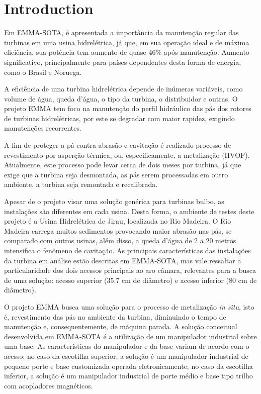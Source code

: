 \section{Introduction}


Em EMMA-SOTA, é apresentada a importância da manutenção regular das turbinas em
uma usina hidrelétrica, já que, em sua operação ideal e de máxima eficiência,
sua potência tem aumento de quase 46\% após manutenção. Aumento significativo,
principalmente para países dependentes desta forma de energia, como o Brasil e
Noruega.

A eficiência de uma turbina hidrelétrica depende de inúmeras variáveis, como
volume de água, queda d'água, o tipo da turbina, o distribuidor e outras. O
projeto EMMA tem foco na manutenção do perfil hidráulico das pás dos rotores de
turbinas hidrelétricas, por este se degradar com maior rapidez, exigindo
manutenções recorrentes. 

A fim de proteger a pá contra abrasão e cavitação é realizado processo de
revestimento por asperção térmica, ou, especificamente, a metalização (HVOF).
Atualmente, este processo pode levar cerca de dois meses por turbina,
já que exige que a turbina seja desmontada, as pás serem processadas em
outro ambiente, a turbina seja remontada e recalibrada.

Apesar de o projeto visar uma solução genérica para turbinas bulbo, as
instalações são diferentes em cada usina. Desta forma, o ambiente de testes
deste projeto é a Usina Hidrelétrica de Jirau, localizada no Rio Madeira. O Rio
Madeira carrega muitos sedimentos provocando maior abrasão nas pás, se comparado
com outros usinas, além disso, a queda d'água de 2 a 20 metros intensifica o
fenômeno de cavitação. As principais características das instalações da turbina
em análise estão descritas em EMMA-SOTA, mas vale ressaltar a particularidade
dos dois acessos principais ao aro câmara, relevantes para a busca de uma
solução: acesso superior (35.7 cm de diâmetro) e acesso inferior (80 cm de
diâmetro).

O projeto EMMA busca uma solução para o processo de metalização \textit{in
situ}, isto é, revestimento das pás no ambiente da turbina, diminuindo o tempo
de manutenção e, consequentemente, de máquina parada.  A solução conceitual
desenvolvida em EMMA-SOTA é a utilização de um manipulador industrial sobre uma
base. As características do manipulador e da base variam de acordo com o
acesso: no caso da escotilha superior, a solução é um manipulador industrial de
pequeno porte e base customizada operada eletronicamente; no caso da escotilha
inferior, a solução é um manipulador industrial de porte médio e base tipo
trilho com acopladores magnéticos.

